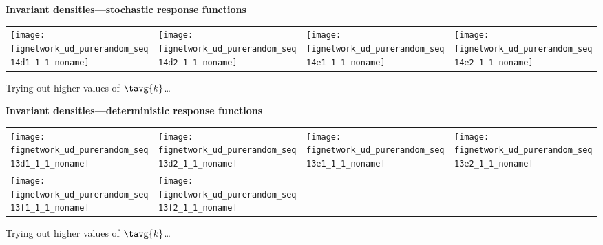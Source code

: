

  \textbf{Invariant densities---stochastic response functions}
  \begin{tabular}{llll}
    \texttt{[image: fignetwork\_ud\_purerandom\_seq14d1\_1\_1\_noname]} &
    \texttt{[image: fignetwork\_ud\_purerandom\_seq14d2\_1\_1\_noname]} &
    \texttt{[image: fignetwork\_ud\_purerandom\_seq14e1\_1\_1\_noname]} &
    \texttt{[image: fignetwork\_ud\_purerandom\_seq14e2\_1\_1\_noname]} \\
  \end{tabular}
  Trying out higher values of $\tavg{k}$\ldots
        


  \textbf{Invariant densities---deterministic response functions}
  \begin{tabular}{llll}
    \texttt{[image: fignetwork\_ud\_purerandom\_seq13d1\_1\_1\_noname]} &
      \texttt{[image: fignetwork\_ud\_purerandom\_seq13d2\_1\_1\_noname]} &
      \texttt{[image: fignetwork\_ud\_purerandom\_seq13e1\_1\_1\_noname]} &
      \texttt{[image: fignetwork\_ud\_purerandom\_seq13e2\_1\_1\_noname]} \\
      \texttt{[image: fignetwork\_ud\_purerandom\_seq13f1\_1\_1\_noname]} &
      \texttt{[image: fignetwork\_ud\_purerandom\_seq13f2\_1\_1\_noname]} &
      \\
  \end{tabular}
  Trying out higher values of $\tavg{k}$\ldots




